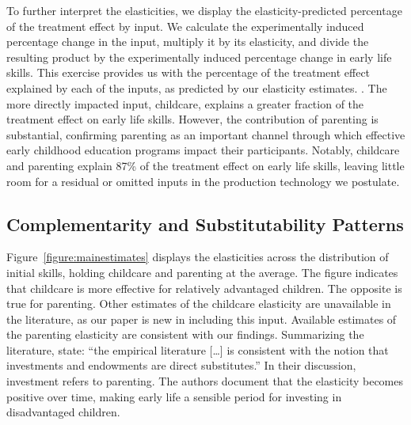 To further interpret the elasticities, we display the elasticity-predicted percentage of the treatment effect by input. We calculate the experimentally induced percentage change in the input, multiply it by its elasticity, and divide the resulting product by the experimentally induced percentage change in early life skills. This exercise provides us with the percentage of the treatment effect explained by each of the inputs, as predicted by our elasticity estimates. \citep[i.e., a form of causal mediation analysis;][]{heckmanEconometricMediationAnalyses2015}. The more directly impacted input, childcare, explains a greater fraction of the treatment effect on early life skills. However, the contribution of parenting is substantial, confirming parenting as an important channel through which effective early childhood education programs impact their participants. Notably, childcare and parenting explain 87\% of the treatment effect on early life skills, leaving little room for a residual or omitted inputs in the production technology we postulate. 


\subsection{ Complementarity and Substitutability Patterns}

Figure~\ref{figure:mainestimates} displays the elasticities across the distribution of initial skills, holding childcare and parenting at the average. The figure indicates that childcare is more effective for relatively advantaged children. The opposite is true for parenting. Other estimates of the childcare elasticity are unavailable in the literature, as our paper is new in including this input. Available estimates of the parenting elasticity are consistent with our findings. Summarizing the literature, \citet{heckmanEconomicsHumanDevelopment2014b} state: ``the empirical literature [\ldots ] is consistent with the notion that investments and endowments are direct substitutes.'' In their discussion, investment refers to parenting. The authors document that the elasticity becomes positive over time, making early life a sensible period for investing in disadvantaged children.

